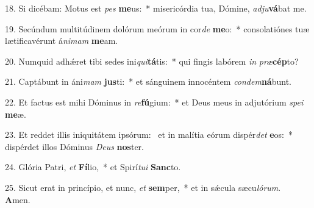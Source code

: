 18. Si dicébam: Motus est \textit{pes} \textbf{me}us:~*  misericórdia tua, Dómine, \textit{ad}\textit{ju}\textbf{vá}bat me.\

19. Secúndum multitúdinem dolórum meórum in cor\textit{de} \textbf{me}o:~*  consolatiónes tuæ lætificavérunt á\textit{ni}\textit{mam} \textbf{me}am.\

20. Numquid adhǽret tibi sedes ini\textit{qui}\textbf{tá}tis:~*  qui fingis labórem \textit{in} \textit{præ}\textbf{cép}to?\

21. Captábunt in áni\textit{mam} \textbf{jus}ti:~*  et sánguinem innocéntem \textit{con}\textit{dem}\textbf{ná}bunt.\

22. Et factus est mihi Dóminus in \textit{re}\textbf{fú}gium:~*  et Deus meus in adjutórium \textit{spe}\textit{i} \textbf{me}æ.\

23. Et reddet illis iniquitátem ipsórum: \dag\  et in malítia eórum dispér\textit{det} \textbf{e}os:~*  dispérdet illos Dóminus \textit{De}\textit{us} \textbf{nos}ter.\

24. Glória Patri, \textit{et} \textbf{Fí}lio,~*  et Spirí\textit{tu}\textit{i} \textbf{Sanc}to.\

25. Sicut erat in princípio, et nunc, \textit{et} \textbf{sem}per,~*  et in sǽcula sæcu\textit{ló}\textit{rum}. \textbf{A}men.\

